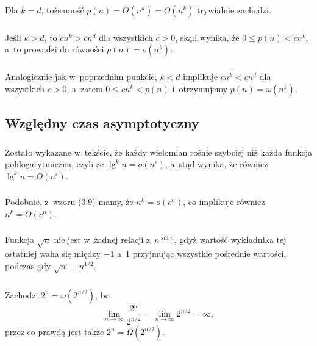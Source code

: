 \subsubsection{} %
Dla $k=d$, tożsamość $p(n)=\Theta(n^d)=\Theta(n^k)$ trywialnie zachodzi.

\subsubsection{} %
Jeśli $k>d$, to $cn^k>cn^d$ dla wszystkich $c>0$, skąd wynika, że $0\le p(n)<cn^k$, a~to prowadzi do równości $p(n)=o(n^k)$.

\subsubsection{} %
Analogicznie jak w~poprzednim punkcie, $k<d$ implikuje $cn^k<cn^d$ dla wszystkich $c>0$, a~zatem $0\le cn^k<p(n)$ i~otrzymujemy $p(n)=\omega(n^k)$.

\subsection{Względny czas asymptotyczny} %

\subsubsection{} %
Zostało wykazane w~tekście, że każdy wielomian rośnie szybciej niż każda funkcja polilogarytmiczna, czyli że $\lg^kn=o(n^\epsilon)$, a~stąd wynika, że również $\lg^kn=O(n^\epsilon)$.

\subsubsection{} %
Podobnie, z~wzoru (3.9) mamy, że $n^k=o(c^n)$, co implikuje również $n^k=O(c^n)$.

\subsubsection{} %
Funkcja $\sqrt{n}$ nie jest w~żadnej relacji z~$n^{\sin n}$, gdyż wartość wykładnika tej ostatniej waha się między $-1$ a~1 przyjmując wszystkie pośrednie wartości, podczas gdy $\sqrt{n}\equiv n^{1/2}$.

\subsubsection{} %
Zachodzi $2^n=\omega(2^{n/2})$, bo
\[
	\lim_{n\to\infty}\frac{2^n}{2^{n/2}} = \lim_{n\to\infty}2^{n/2} = \infty,
\]
przez co prawdą jest także $2^n=\Omega(2^{n/2})$.

